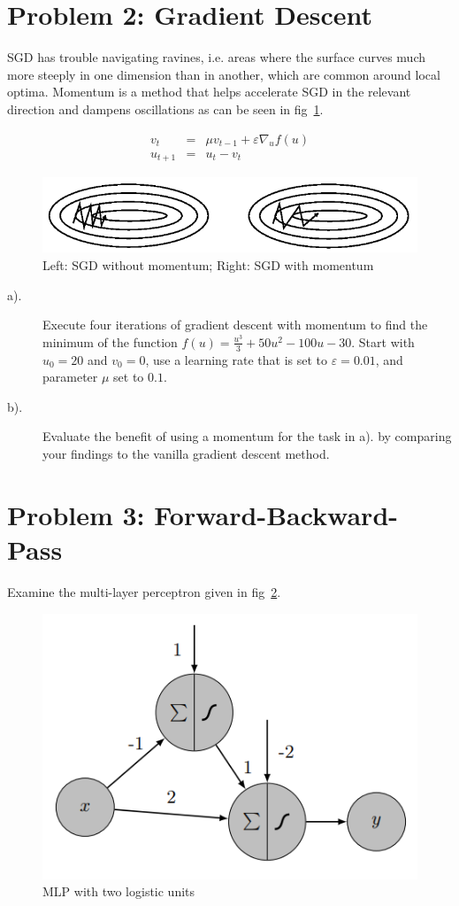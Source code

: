 \documentclass[12pt]{article}
\begin{document}

\section{Problem 2: Gradient Descent}
SGD has trouble navigating ravines, i.e. areas where the surface curves much more steeply in one dimension than in another, which are common around local optima. Momentum is a method that helps accelerate SGD in the relevant direction and dampens oscillations as can be seen in fig~\ref{fig:momentum}.

\begin{eqnarray*}
	v_t & = & \mu v_{t-1} + \varepsilon \nabla_u f(u)  \\
	u_{t+1} & =& u_{t} - v_t
\end{eqnarray*}

\begin{figure}[!htbp]
	\centering
	\includegraphics[width=.7\textwidth]{fig/2018-03-19-13-38-08.png}
	\caption{Left: SGD without momentum; Right: SGD with momentum} \label{fig:momentum}
\end{figure}


\begin{description}
	\item[a).] Execute four iterations of gradient descent with momentum to find the minimum of
	      the function $f(u) = \frac{u^3}{3} + 50 u^2-100u-30$. Start with $u_0 = 20$ and $v_0=0$, use a learning rate
	      that is set to $\varepsilon = 0.01$, and parameter $\mu$ set to $0.1$.
	\item[b).] Evaluate the benefit of using a momentum for the task in a). by comparing your
	      findings to the vanilla gradient descent method.
\end{description}

\section{Problem 3: Forward-Backward-Pass}
Examine the multi-layer perceptron given in fig~\ref{fig:mlp}.

\begin{figure}[!htbp]
	\centering
	\includegraphics[width=.5\textwidth]{fig/2018-03-19-13-49-49.png}
	\caption{MLP with two logistic units} \label{fig:mlp}
\end{figure}
\end{document}
